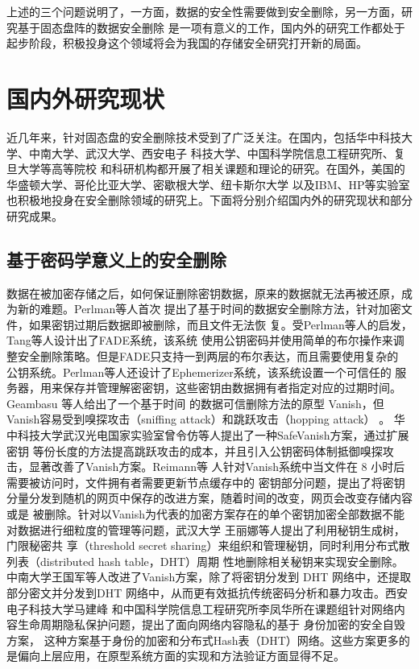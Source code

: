 上述的三个问题说明了，一方面，数据的安全性需要做到安全删除，另一方面，研究基于固态盘阵的数据安全删除
是一项有意义的工作，国内外的研究工作都处于起步阶段，积极投身这个领域将会为我国的存储安全研究打开新的局面。

\section{国内外研究现状}
近几年来，针对固态盘的安全删除技术受到了广泛关注。在国内，包括华中科技大学、中南大学、武汉大学、西安电子
科技大学、中国科学院信息工程研究所、复旦大学等高等院校
和科研机构都开展了相关课题和理论的研究。在国外，美国的华盛顿大学、哥伦比亚大学、密歇根大学、纽卡斯尔大学
以及IBM、HP等实验室也积极地投身在安全删除领域的研究上。下面将分别介绍国内外的研究现状和部分研究成果。
\subsection{基于密码学意义上的安全删除}
数据在被加密存储之后，如何保证删除密钥数据，原来的数据就无法再被还原，成为新的难题。Perlman等人首次
提出了基于时间的数据安全删除方法，针对加密文件，如果密钥过期后数据即被删除，而且文件无法恢
复\cite{Perlman2005File}。受Perlman等人的启发，Tang等人设计出了FADE系统\cite{Tang2012Secure}，该系统
使用公钥密码并使用简单的布尔操作来调整安全删除策略。但是FADE只支持一到两层的布尔表达，而且需要使用复杂的
公钥系统。Perlman等人还设计了Ephemerizer系统\cite{Perlman2005The,Tang2009Timed}，该系统设置一个可信任的
服务器，用来保存并管理解密密钥，这些密钥由数据拥有者指定对应的过期时间。Geambasu 等人给出了一个基于时间
的数据可信删除方法的原型 Vanish\cite{Geambasu2009Vanish}，但Vanish容易受到嗅探攻击（sniffing attack）和跳跃攻击（hopping attack）\cite{Wolchok2010Defeating} 。
华中科技大学武汉光电国家实验室曾令仿等人提出了一种SafeVanish\cite{Zeng2010SafeVanish}方案，通过扩展密钥
等份长度的方法提高跳跃攻击的成本，并且引入公钥密码体制抵御嗅探攻击，显著改善了Vanish方案。Reimann等
人\cite{Reimann2012Timed}针对Vanish系统中当文件在 8 小时后需要被访问时，文件拥有者需要更新节点缓存中的
密钥部分问题，提出了将密钥分量分发到随机的网页中保存的改进方案，随着时间的改变，网页会改变存储内容或是
被删除。针对以Vanish为代表的加密方案存在的单个密钥加密全部数据不能对数据进行细粒度的管理等问题，武汉大学
王丽娜等人\cite{王丽娜2012一种适于云存储的数据确定性删除方法}提出了利用秘钥生成树，门限秘密共
享（threshold secret sharing）来组织和管理秘钥，同时利用分布式散列表（distributed hash table，DHT）周期
性地删除相关秘钥来实现安全删除。中南大学王国军等人改进了Vanish方案，除了将密钥分发到 DHT 网络中，还提取
部分密文并分发到DHT 网络中，从而更有效抵抗传统密码分析和暴力攻击\cite{Wang2010A}。西安电子科技大学马建峰
和中国科学院信息工程研究所李凤华所在课题组针对网络内容生命周期隐私保护问题，提出了面向网络内容隐私的基于
身份加密的安全自毁方案\cite{熊金波2014云计算环境中的组合文档模型及其访问控制方案,熊金波2014基于属性加密的组合文档安全自毁方案,熊金波2014面向网络内容隐私的基于身份加密的安全自毁方案}，
这种方案基于身份的加密和分布式Hash表（DHT）网络。这些方案更多的是偏向上层应用，在原型系统方面的实现和方法验证方面显得不足。

